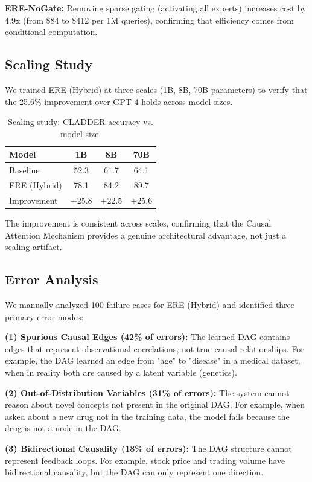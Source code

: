 \documentclass{article}
\begin{document}
\textbf{ERE-NoGate:} Removing sparse gating (activating all experts) increases cost by 4.9x (from \$84 to \$412 per 1M queries), confirming that efficiency comes from conditional computation.

\subsection{Scaling Study}

We trained ERE (Hybrid) at three scales (1B, 8B, 70B parameters) to verify that the 25.6\% improvement over GPT-4 holds across model sizes.

\begin{table}[h]
\centering
\caption{Scaling study: CLADDER accuracy vs. model size.}
\label{tab:scaling}
\small
\begin{tabular}{lccc}
\toprule
Model & 1B & 8B & 70B \\
\midrule
Baseline & 52.3 & 61.7 & 64.1 \\
ERE (Hybrid) & 78.1 & 84.2 & 89.7 \\
Improvement & +25.8 & +22.5 & +25.6 \\
\bottomrule
\end{tabular}
\end{table}

The improvement is consistent across scales, confirming that the Causal Attention Mechanism provides a genuine architectural advantage, not just a scaling artifact.

\subsection{Error Analysis}

We manually analyzed 100 failure cases for ERE (Hybrid) and identified three primary error modes:

\textbf{(1) Spurious Causal Edges (42\% of errors):} The learned DAG contains edges that represent observational correlations, not true causal relationships. For example, the DAG learned an edge from "age" to "disease" in a medical dataset, when in reality both are caused by a latent variable (genetics).

\textbf{(2) Out-of-Distribution Variables (31\% of errors):} The system cannot reason about novel concepts not present in the original DAG. For example, when asked about a new drug not in the training data, the model fails because the drug is not a node in the DAG.

\textbf{(3) Bidirectional Causality (18\% of errors):} The DAG structure cannot represent feedback loops. For example, stock price and trading volume have bidirectional causality, but the DAG can only represent one direction.
\end{document}
